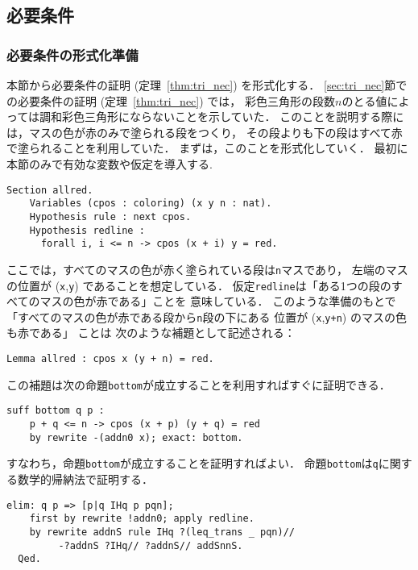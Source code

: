 

\subsection{必要条件}
\subsubsection{必要条件の形式化準備}
本節から必要条件の証明 (定理~\ref{thm:tri_nec}) を形式化する．
\ref{sec:tri_nec}節での必要条件の証明 (定理~\ref{thm:tri_nec}) では，
彩色三角形の段数$n$のとる値によっては調和彩色三角形にならないことを示していた．
このことを説明する際には，マスの色が赤のみで塗られる段をつくり，
その段よりも下の段はすべて赤で塗られることを利用していた．
まずは，このことを形式化していく．
最初に本節のみで有効な変数や仮定を導入する.
\begin{lstlisting}[language=Coq]
  Section allred.
    Variables (cpos : coloring) (x y n : nat).
    Hypothesis rule : next cpos.
    Hypothesis redline :
      forall i, i <= n -> cpos (x + i) y = red.
\end{lstlisting}
ここでは，すべてのマスの色が赤く塗られている段は{\tt{n}}マスであり，
左端のマスの位置が ({\tt{x}},{\tt{y}}) であることを想定している．
仮定{\tt{redline}}は「ある1つの段のすべてのマスの色が赤である」ことを
意味している．
このような準備のもとで
「すべてのマスの色が赤である段から{\tt{n}}段の下にある
  位置が ({\tt{x}},{\tt{y+n}}) のマスの色も赤である」
ことは
次のような補題として記述される：
\begin{lstlisting}[language=Coq]
  Lemma allred : cpos x (y + n) = red.
\end{lstlisting}
この補題は次の命題{\tt{bottom}}が成立することを利用すればすぐに証明できる．
\begin{lstlisting}[language=Coq]
  suff bottom q p :
    p + q <= n -> cpos (x + p) (y + q) = red
    by rewrite -(addn0 x); exact: bottom.
\end{lstlisting}
すなわち，命題{\tt{bottom}}が成立することを証明すればよい．
命題{\tt{bottom}}は{\tt{q}}に関する数学的帰納法で証明する．
\begin{lstlisting}[language=Coq]
    elim: q p => [p|q IHq p pqn];
    first by rewrite !addn0; apply redline.
    by rewrite addnS rule IHq ?(leq_trans _ pqn)//
         -?addnS ?IHq// ?addnS// addSnnS.
  Qed.
\end{lstlisting}

